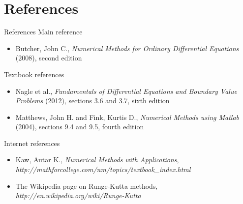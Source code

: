 \documentclass[12pt]{beamer}
\begin{document}
\section*{References}
\begin{frame}{References}
Main reference
\begin{itemize} \item Butcher, John C., \textit{Numerical Methods for Ordinary Differential Equations} (2008), second edition \end{itemize}
Textbook references
\begin{itemize}
  \item Nagle et al., \textit{Fundamentals of Differential Equations and Boundary Value Problems}
           (2012), sections 3.6 and 3.7, sixth edition
  \item Matthews, John H. and Fink, Kurtis D., \textit{Numerical Methods using Matlab} (2004),
           sections 9.4 and 9.5, fourth edition 
\end{itemize}
Internet references

\begin{itemize}
  \item Kaw, Autar K., \textit{Numerical Methods with Applications},
          \textit{http://mathforcollege.com/nm/topics/textbook\_index.html}
  \item The Wikipedia page on Runge-Kutta methods, \textit{http://en.wikipedia.org/wiki/Runge-Kutta}
\end{itemize}

\end{frame}
\end{document}
